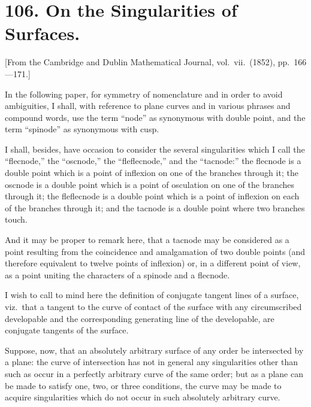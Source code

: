 \documentclass[11pt,a4paper]{book}
\begin{document}
\section*{106. On the Singularities of Surfaces.}

[From the Cambridge and Dublin Mathematical Journal, vol.\ vii.\ (1852), pp.\ 166---171.]

In the following paper, for symmetry of nomenclature and in order to avoid ambiguities, I shall, with reference to plane curves and in various phrases and compound words, use the term ``node'' as synonymous with double point, and the term ``spinode'' as synonymous with cusp.

I shall, besides, have occasion to consider the several singularities which I call the ``flecnode,'' the ``oscnode,'' the ``fleflecnode,'' and the ``tacnode:'' the flecnode is a double point which is a point of inflexion on one of the branches through it; the oscnode is a double point which is a point of osculation on one of the branches through it; the fleflecnode is a double point which is a point of inflexion on each of the branches through it; and the tacnode is a double point where two branches touch.

And it may be proper to remark here, that a tacnode may be considered as a point resulting from the coincidence and amalgamation of two double points (and therefore equivalent to twelve points of inflexion) or, in a different point of view, as a point uniting the characters of a spinode and a flecnode.

I wish to call to mind here the definition of conjugate tangent lines of a surface, viz.\ that a tangent to the curve of contact of the surface with any circumscribed developable and the corresponding generating line of the developable, are conjugate tangents of the surface.

Suppose, now, that an absolutely arbitrary surface of any order be intersected by a plane: the curve of intersection has not in general any singularities other than such as occur in a perfectly arbitrary curve of the same order; but as a plane can be made to satisfy one, two, or three conditions, the curve may be made to acquire singularities which do not occur in such absolutely arbitrary curve.
\end{document}
